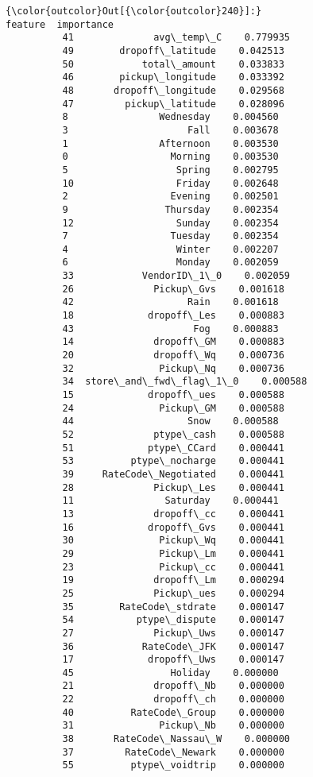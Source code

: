 \documentclass[11pt]{article}
\begin{document}
\begin{Verbatim}[commandchars=\\\{\}]
{\color{outcolor}Out[{\color{outcolor}240}]:}                    feature  importance
          41              avg\_temp\_C    0.779935
          49        dropoff\_latitude    0.042513
          50            total\_amount    0.033833
          46        pickup\_longitude    0.033392
          48       dropoff\_longitude    0.029568
          47         pickup\_latitude    0.028096
          8                Wednesday    0.004560
          3                     Fall    0.003678
          1                Afternoon    0.003530
          0                  Morning    0.003530
          5                   Spring    0.002795
          10                  Friday    0.002648
          2                  Evening    0.002501
          9                 Thursday    0.002354
          12                  Sunday    0.002354
          7                  Tuesday    0.002354
          4                   Winter    0.002207
          6                   Monday    0.002059
          33            VendorID\_1\_0    0.002059
          26              Pickup\_Gvs    0.001618
          42                    Rain    0.001618
          18             dropoff\_Les    0.000883
          43                     Fog    0.000883
          14              dropoff\_GM    0.000883
          20              dropoff\_Wq    0.000736
          32               Pickup\_Nq    0.000736
          34  store\_and\_fwd\_flag\_1\_0    0.000588
          15             dropoff\_ues    0.000588
          24               Pickup\_GM    0.000588
          44                    Snow    0.000588
          52              ptype\_cash    0.000588
          51             ptype\_CCard    0.000441
          53          ptype\_nocharge    0.000441
          39     RateCode\_Negotiated    0.000441
          28              Pickup\_Les    0.000441
          11                Saturday    0.000441
          13              dropoff\_cc    0.000441
          16             dropoff\_Gvs    0.000441
          30               Pickup\_Wq    0.000441
          29               Pickup\_Lm    0.000441
          23               Pickup\_cc    0.000441
          19              dropoff\_Lm    0.000294
          25              Pickup\_ues    0.000294
          35        RateCode\_stdrate    0.000147
          54           ptype\_dispute    0.000147
          27              Pickup\_Uws    0.000147
          36            RateCode\_JFK    0.000147
          17             dropoff\_Uws    0.000147
          45                 Holiday    0.000000
          21              dropoff\_Nb    0.000000
          22              dropoff\_ch    0.000000
          40          RateCode\_Group    0.000000
          31               Pickup\_Nb    0.000000
          38       RateCode\_Nassau\_W    0.000000
          37         RateCode\_Newark    0.000000
          55          ptype\_voidtrip    0.000000
\end{Verbatim}
            
\end{document}
